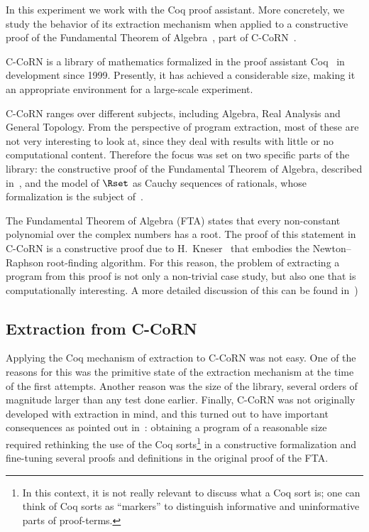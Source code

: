 \documentclass{entcs}
\begin{document}
In this experiment we work with the Coq proof assistant.  More concretely,
we study the behavior of its extraction mechanism when applied to a
constructive proof of the Fundamental Theorem of
Algebra~\cite{geu:wie:zwa:01}, part of C-CoRN~\cite{lcf:geu:wie:04a}.

C-CoRN is a library of mathematics formalized
in the proof assistant Coq~\cite{coqmanual} in development
since 1999.  Presently, it has achieved a considerable size, making it
an appropriate environment for a large-scale experiment.

C-CoRN ranges over different subjects, including Algebra, Real
Analysis and General Topology.  From the perspective of program extraction,
most of these are not very interesting to look at,
since they deal with results with little or no computational
content.  Therefore the focus was set on two specific parts of the
library: the constructive proof of the Fundamental Theorem of Algebra,
described in~\cite{geu:wie:zwa:01}, and the model of $\Rset$
as Cauchy sequences of rationals, whose formalization is the subject
of~\cite{geu:niq:02}.

The Fundamental Theorem of Algebra (FTA) states that every
non-con\-stant polynomial over the complex numbers has a root.  The proof
of this statement in C-CoRN is a constructive proof due to
H.~Kneser~\cite{kne:81} that embodies
the Newton--Raphson root-finding algorithm.
For this reason, the problem of extracting a program from this proof
is not only a non-trivial case study, but also one that is computationally
interesting.  A more detailed discussion of this can be found
in~\cite{geu:wie:zwa:01})

\subsection{Extraction from C-CoRN}

Applying the Coq mechanism of extraction to C-CoRN
was not easy.  One of the reasons for this was the primitive state of
the extraction mechanism at the time of the first attempts. Another
reason was the size of the library, several orders of
magnitude larger than any test done earlier. Finally, C-CoRN was not
originally developed with extraction in mind, 
and this turned out to have important consequences as pointed out
in~\cite{lcf:spi:03}: obtaining a program of
a reasonable size required rethinking the use of the Coq
sorts\footnote{In this context, it is not really relevant to discuss what
a Coq sort is; one can think of Coq sorts as ``markers'' to distinguish
informative and uninformative parts of proof-terms.} in a
constructive formalization and fine-tuning several proofs and
definitions in the original proof of the FTA.
\end{document}
